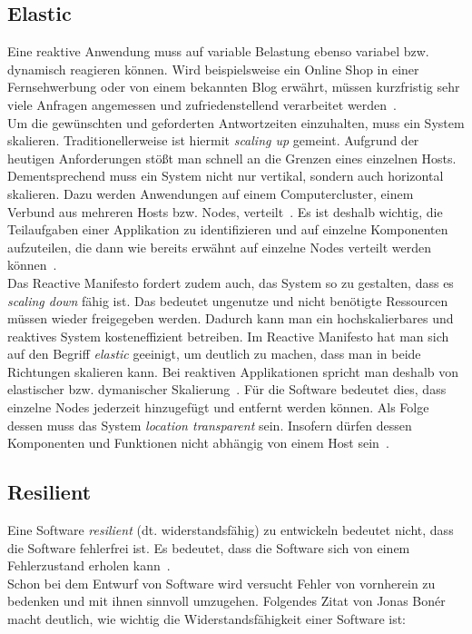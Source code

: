 \subsection{Elastic}\label{subsec:elastic}
Eine reaktive Anwendung muss auf variable Belastung ebenso variabel bzw. dynamisch reagieren können. Wird beispielsweise ein Online Shop in einer Fernsehwerbung oder von einem bekannten Blog erwährt, müssen kurzfristig sehr viele Anfragen angemessen und zufriedenstellend verarbeitet werden~\cite[S.~39]{kuhn_reactive_2015}.\\
Um die gewünschten und geforderten Antwortzeiten einzuhalten, muss ein System skalieren. Traditionellerweise ist hiermit \textit{scaling up} gemeint. Aufgrund der heutigen Anforderungen stößt man schnell an die Grenzen eines einzelnen Hosts. Dementsprechend muss ein System nicht nur vertikal, sondern auch horizontal skalieren. Dazu werden Anwendungen auf einem Computercluster, einem Verbund aus mehreren Hosts bzw. Nodes, verteilt~\cite[S.~7]{vernon_reactive_2016}. Es ist deshalb wichtig, die Teilaufgaben einer Applikation zu identifizieren und auf einzelne Komponenten aufzuteilen, die dann wie bereits erwähnt auf einzelne Nodes verteilt werden können~\cite[S.~40]{kuhn_reactive_2015}.\\
Das Reactive Manifesto fordert zudem auch, das System so zu gestalten, dass es \textit{scaling down} fähig ist. Das bedeutet ungenutze und nicht benötigte Ressourcen müssen wieder freigegeben werden. Dadurch kann man ein hochskalierbares und reaktives System kosteneffizient betreiben. Im Reactive Manifesto hat man sich auf den Begriff \textit{elastic} geeinigt, um deutlich zu machen, dass man in beide Richtungen skalieren kann. Bei reaktiven Applikationen spricht man deshalb von elastischer bzw. dymanischer Skalierung~\cite[S.~8]{vernon_reactive_2016}. Für die Software bedeutet dies, dass einzelne Nodes jederzeit hinzugefügt und entfernt werden können. Als Folge dessen muss das System \textit{location transparent} sein. Insofern dürfen dessen Komponenten und Funktionen nicht abhängig von einem Host sein~\cite[S.~8]{vernon_reactive_2016}. 


\pagebreak

\subsection{Resilient}\label{subsec:resilient}
Eine Software \textit{resilient} (dt. widerstandsfähig) zu entwickeln bedeutet nicht, dass die Software fehlerfrei ist. Es bedeutet, dass die Software sich von einem Fehlerzustand erholen kann~\cite[S.~6]{vernon_reactive_2016}.\\
Schon bei dem Entwurf von Software wird versucht Fehler von vornherein zu bedenken und mit ihnen sinnvoll umzugehen. Folgendes Zitat von Jonas Bonér macht deutlich, wie wichtig die Widerstandsfähigkeit einer Software ist:

